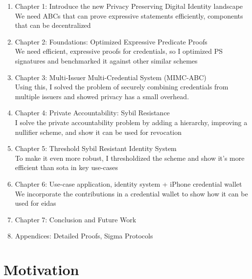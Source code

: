 
\begin{enumerate}
    \item Chapter 1: Introduce the new Privacy Preserving Digital Identity landscape \\
    We need ABCs that can prove expressive statements efficiently, components that can be decentralized

    \item Chapter 2: Foundations: Optimized Expressive Predicate Proofs \\
    We need efficient, expressive proofs for credentials, so I optimized PS signatures and benchmarked it against other similar schemes

    \item Chapter 3: Multi-Issuer Multi-Credential System (MIMC-ABC) \\
    Using this, I solved the problem of securely combining credentials from multiple issuers and showed privacy has a small overhead.

    \item Chapter 4: Private Accountability: Sybil Resistance \\
    I solve the private accountability problem by adding a hierarchy, improving a nullifier scheme, and show it can be used for revocation

    \item Chapter 5: Threshold Sybil Resistant Identity System \\
    To make it even more robust, I thresholdized the scheme and show it's more efficient than sota in key use-cases

    \item Chapter 6: Use-case application, identity system + iPhone credential wallet \\
    We incorporate the contributions in a credential wallet to show how it can be used for eidas
    
    \item Chapter 7: Conclusion and Future Work

    \item Appendices: Detailed Proofs, Sigma Protocols
    
\end{enumerate}



\newpage
\section{Motivation}
